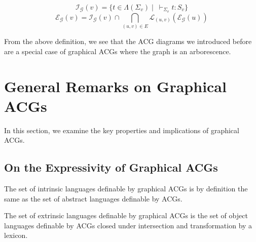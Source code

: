 $$
\mathcal{I}_{\mathcal{G}}(v) = \{t \in \Lambda(\Sigma_v)
\mid\ \vdash_{\Sigma_v} t : S_v\}
$$
$$
\mathcal{E}_{\mathcal{G}}(v) = \mathcal{I}_{\mathcal{G}}(v) \cap
\bigcap_{(u,v) \in E} \mathcal{L}_{(u,v)}(\mathcal{E}_{\mathcal{G}}(u))
$$

From the above definition, we see that the ACG diagrams we introduced
before are a special case of graphical ACGs where the graph is an
arborescence.

\section{General Remarks on Graphical ACGs}

In this section, we examine the key properties and implications of
graphical ACGs.

\subsection{On the Expressivity of Graphical ACGs}

\begin{observation}
  The set of intrinsic languages definable by graphical ACGs is by
  definition the same as the set of abstract languages definable by
  ACGs.
\end{observation}

\begin{theorem}
  The set of extrinsic languages definable by graphical ACGs is the set
  of object languages definable by ACGs closed under intersection and
  transformation by a lexicon.
\end{theorem}

